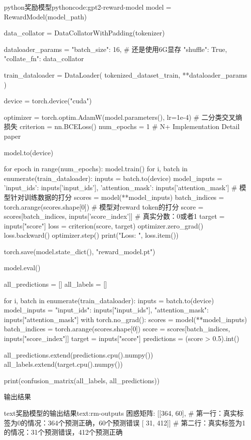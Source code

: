 \documentclass[lang=cn,newtx,10pt,scheme=chinese]{elegantbook}
\begin{document}
\begin{codebox}{python}{奖励模型}{pythoncode:gpt2-reward-model}
model = RewardModel(model_path)

data_collator = DataCollatorWithPadding(tokenizer)

dataloader_params = {
    "batch_size": 16, # 还是使用6G显存
    "shuffle": True,
    "collate_fn": data_collator
}

train_dataloader = DataLoader(
    tokenized_dataset_train,
    **dataloader_params
)

device = torch.device("cuda")

optimizer = torch.optim.AdamW(model.parameters(), lr=1e-4)
# 二分类交叉熵损失
criterion = nn.BCELoss()
num_epochs = 1 # N+ Implementation Detail paper

model.to(device)

for epoch in range(num_epochs):
    model.train()
    for i, batch in enumerate(train_dataloader):
        inputs = batch.to(device)
        model_inputs = {
            'input_ids': inputs['input_ids'],
            'attention_mask': inputs['attention_mask']
        }
        # 模型针对训练数据的打分
        scores = model(**model_inputs)
        batch_indices = torch.arange(scores.shape[0])
        # 模型对reward token的打分
        score = scores[batch_indices, inputs['score_index']]
        # 真实分数：0或者1
        target = inputs["score"]
        loss = criterion(score, target)
        optimizer.zero_grad()
        loss.backward()
        optimizer.step()
        print("Loss: ", loss.item())

torch.save(model.state_dict(), "reward_model.pt")

model.eval()

all_predictions = []
all_labels = []

for i, batch in enumerate(train_dataloader):
    inputs = batch.to(device)
    model_inputs = {
        "input_ids": inputs["input_ids"],
        "attention_mask": inputs["attention_mask"]
    }
    with torch.no_grad():
        scores = model(**model_inputs)
        batch_indices = torch.arange(scores.shape[0])
        score = scores[batch_indices, inputs["score_index"]]
        target = inputs["score"]
    predictions = (score > 0.5).int()

    all_predictions.extend(predictions.cpu().numpy())
    all_labels.extend(target.cpu().numpy())

print(confusion_matrix(all_labels, all_predictions))
\end{codebox}

输出结果

\begin{codebox}{text}{奖励模型的输出结果}{text:rm-outputs}
困惑矩阵:
[[364,  60],   # 第一行：真实标签为0的情况：364个预测正确，60个预测错误
 [ 31, 412]]   # 第二行：真实标签为1的情况：31个预测错误，412个预测正确
\end{codebox}
\end{document}
